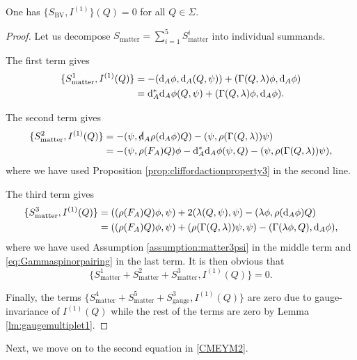 \documentclass[10pt, oneside]{article}
\newcommand{\BV}{\mathrm{BV}}
\newcommand{\gauge}{\mathrm{gauge}}
\newcommand{\matter}{\mathrm{matter}}
\begin{document}
\begin{lemma} \label{lem:YM1}
One has $\{S_{\BV}, I^{(1)}\} (Q) = 0$ for all $Q \in \Sigma$. 
\end{lemma}
\begin{proof}
Let us decompose $S_{\matter}=\sum_{i=1}^5 S_{\matter}^i$ into individual summands.

The first term gives
\begin{align*}
\{S_{\matter}^1, I^{(1)}(Q)\} &= -(\d_A\phi, \d_A(Q, \psi)) + (\Gamma(Q, \lambda)\phi, \d_A\phi) \\
&= \d_A^* \d_A\phi (Q, \psi) + (\Gamma(Q, \lambda)\phi, \d_A\phi).
\end{align*}

The second term gives
\begin{align*}
\{S_{\matter}^2, I^{(1)}(Q)\} &= -(\psi, \sd \d_A \rho(\d_A \phi) Q) - (\psi, \rho(\Gamma(Q, \lambda))\psi) \\
&= -(\psi, \rho(F_A) Q)\phi - \d_A^*\d_A \phi(\psi, Q) - (\psi, \rho(\Gamma(Q, \lambda))\psi),
\end{align*}
where we have used Proposition \ref{prop:cliffordactionproperty3} in the second line.

The third term gives
\begin{align*}
\{S_{\matter}^3, I^{(1)}(Q)\} &= ((\rho(F_A)Q) \phi, \psi) + 2(\lambda(Q, \psi), \psi) - (\lambda\phi, \rho(\d_A \phi) Q) \\
&= ((\rho(F_A)Q) \phi, \psi) + (\rho(\Gamma(Q, \lambda))\psi, \psi) - (\Gamma(\lambda\phi, Q), \d_A \phi),
\end{align*}
where we have used Assumption \ref{assumption:matter3psi} in the middle term and \eqref{eq:Gammaspinorpairing} in the last term. It is then obvious that
\[\{S_{\matter}^1 + S_{\matter}^2 + S_{\matter}^3, I^{(1)}(Q)\} = 0.\]

Finally, the terms $\{S_{\matter}^4 + S_{\matter}^5 + S_{\gauge}^3, I^{(1)}(Q)\}$ are zero due to gauge-invariance of $I^{(1)}(Q)$ while the rest of the terms are zero by Lemma \ref{lm:gaugemultiplet1}.
\end{proof}

Next, we move on to the second equation in \eqref{CMEYM2}.
\end{document}
